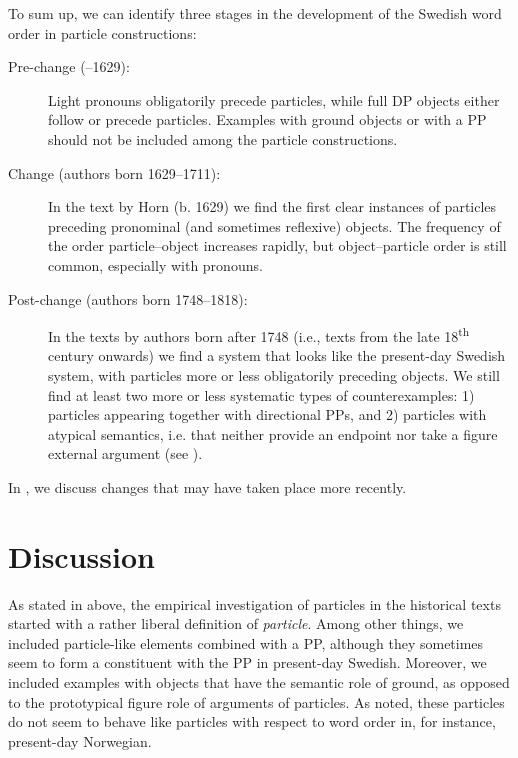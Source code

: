 \documentclass[output=paper]{langscibook}
\begin{document}
To sum up, we can identify three stages in the development of the Swedish word order in particle constructions:


\begin{description}
\item[Pre-change (–1629):] Light pronouns obligatorily precede particles, while full DP objects either follow or precede particles. Examples with ground objects or with a PP should not be included among the particle constructions.
\item[Change (authors born 1629–1711):] In the text by Horn (b. 1629) we find the first clear instances of particles preceding pronominal (and sometimes reflexive) objects. The frequency of the order particle--object increases rapidly, but object–particle order is still common, especially with pronouns.
\item[Post-change (authors born 1748–1818):] In the texts by authors born after 1748 (i.e., texts from the late 18\textsuperscript{th} century onwards) we find a system that looks like the present-day Swedish system, with particles more or less obligatorily preceding objects. We still find at least two more or less systematic types of counterexamples: 1) particles appearing together with directional PPs, and 2) particles with atypical semantics, i.e. that neither provide an endpoint nor take a figure external argument (see ).
\end{description}

In , we discuss changes that may have taken place more recently.


\section{Discussion}\label{sec:lalu:6}


As stated in  above, the empirical investigation of particles in the historical texts started with a rather liberal definition of \textit{particle}. Among other things, we included particle-like elements combined with a PP, although they sometimes seem to form a constituent with the PP in present-day Swedish. Moreover, we included examples with objects that have the semantic role of ground, as opposed to the prototypical figure role of arguments of particles. As noted, these particles do not seem to behave like particles with respect to word order in, for instance, present-day Norwegian.
\end{document}
